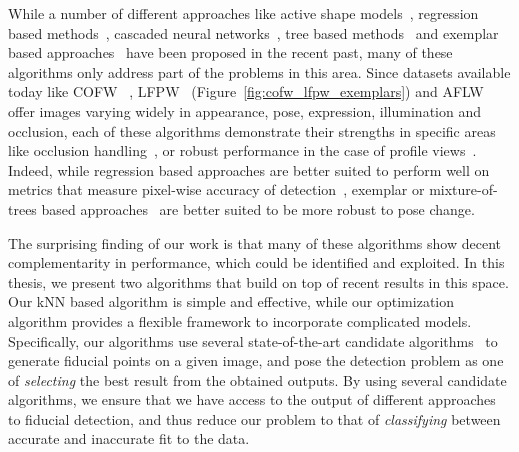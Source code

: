 While a number of different approaches like active shape models~\cite{milborrowCVPR08_ASM},
regression based methods~\cite{yuECCV14_CoR}, cascaded neural
networks~\cite{zhangECCV14_deepfacealign}, tree based methods~\cite{xhuCVPR12_wild} 
and exemplar based approaches~\cite{kumarPAMI13_faceExem}
have been proposed in the recent past, many of these algorithms only
address part of the problems in this area. Since datasets available today like
COFW~\cite{artizzzuICCV13_COFW} ,
LFPW~\cite{kumarPAMI13_faceExem} (Figure~\ref{fig:cofw_lfpw_exemplars}) and AFLW~\cite{koetsingerBFIAT11_AFLW} %
offer images varying widely in appearance, pose, expression, illumination and occlusion,
each of these algorithms demonstrate their strengths in specific areas like
occlusion handling~\cite{artizzzuICCV13_COFW}, or robust performance in the
case of profile views~\cite{xhuCVPR12_wild}. Indeed, while regression based approaches are 
better suited to perform well on metrics that measure pixel-wise accuracy
of detection~\cite{milborrowCVPR08_ASM, yuECCV14_CoR}, exemplar or mixture-of-trees based
approaches~\cite{kumarPAMI13_faceExem, xhuCVPR12_wild} are better suited to be
more robust to pose change.


The surprising finding of our work is that many of these algorithms show
decent complementarity in performance, which could be identified and exploited.
In this thesis, we present two algorithms that build on top of recent results in this space. 
Our kNN based algorithm is simple and effective, while our optimization algorithm provides a 
flexible framework to incorporate complicated models.  Specifically, our 
algorithms use several state-of-the-art candidate algorithms~\cite{xhuCVPR12_wild, xiongCVPR13_SDM,
artizzzuICCV13_COFW, asthanaCVPR14_Chehra, Tzimiropoulos_2015_CVPR} to generate
fiducial points on a given image, and pose the detection problem as one
of \emph{selecting} the best result from the obtained outputs. By using several
candidate algorithms, we ensure that we have access to the output of different approaches
to fiducial detection, and thus reduce our problem to that of \emph{classifying} 
between accurate and inaccurate fit to the data.


